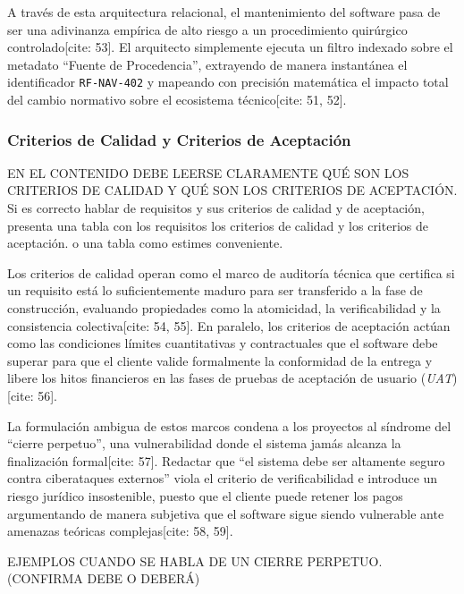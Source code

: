 \documentclass[11pt,a4paper]{article}
\begin{document}
	A través de esta arquitectura relacional, el mantenimiento del software pasa de ser una adivinanza empírica de alto riesgo a un procedimiento quirúrgico controlado[cite: 53]. El arquitecto simplemente ejecuta un filtro indexado sobre el metadato ``Fuente de Procedencia'', extrayendo de manera instantánea el identificador \texttt{RF-NAV-402} y mapeando con precisión matemática el impacto total del cambio normativo sobre el ecosistema técnico[cite: 51, 52].
	
	\subsubsection{Criterios de Calidad y Criterios de Aceptación}
	
	EN EL CONTENIDO DEBE LEERSE CLARAMENTE QUÉ SON LOS CRITERIOS DE CALIDAD Y QUÉ SON LOS CRITERIOS DE ACEPTACIÓN. Si es correcto hablar de requisitos y sus criterios de calidad y de aceptación, presenta una tabla con los requisitos los criterios de calidad y los criterios de aceptación. o una tabla como estimes conveniente.
	
	Los criterios de calidad operan como el marco de auditoría técnica que certifica si un requisito está lo suficientemente maduro para ser transferido a la fase de construcción, evaluando propiedades como la atomicidad, la verificabilidad y la consistencia colectiva[cite: 54, 55]. En paralelo, los criterios de aceptación actúan como las condiciones límites cuantitativas y contractuales que el software debe superar para que el cliente valide formalmente la conformidad de la entrega y libere los hitos financieros en las fases de pruebas de aceptación de usuario (\textit{UAT})[cite: 56].
	
	La formulación ambigua de estos marcos condena a los proyectos al síndrome del ``cierre perpetuo'', una vulnerabilidad donde el sistema jamás alcanza la finalización formal[cite: 57]. Redactar que ``el sistema debe ser altamente seguro contra ciberataques externos'' viola el criterio de verificabilidad e introduce un riesgo jurídico insostenible, puesto que el cliente puede retener los pagos argumentando de manera subjetiva que el software sigue siendo vulnerable ante amenazas teóricas complejas[cite: 58, 59].
	
	EJEMPLOS CUANDO SE HABLA DE UN CIERRE PERPETUO.
	 (CONFIRMA DEBE O DEBERÁ)
	 
\end{document}
